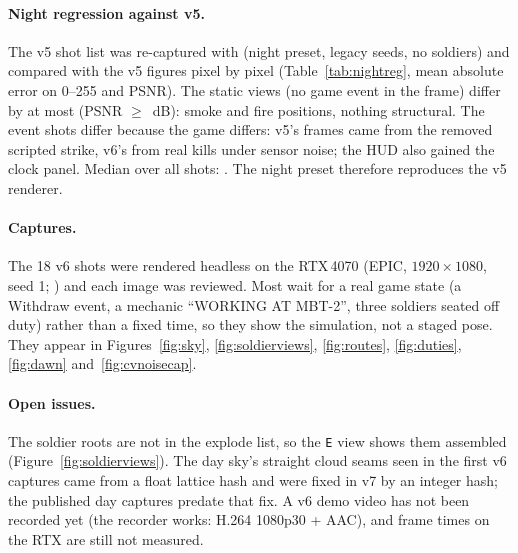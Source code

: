 \paragraph{Night regression against v5.} The v5 shot list was re-captured with  (night preset, legacy seeds, no soldiers) and compared with the v5 figures pixel by pixel (Table~\ref{tab:nightreg}, mean absolute error on 0--255 and PSNR). The \nrStaticN{} static views (no game event in the frame) differ by at most \nrStaticMax{} (PSNR $\ge$ \nrStaticMinPsnr\,dB): smoke and fire positions, nothing structural. The event shots differ because the game differs: v5's frames came from the removed scripted strike, v6's from real kills under sensor noise; the HUD also gained the clock panel. Median over all \nrCount{} shots: \nrMedian. The night preset therefore reproduces the v5 renderer.
\begin{table}[h]
\centering\scriptsize\setlength{\tabcolsep}{4pt}
\caption{Night regression, v6 night preset vs.\ the v5 captures (generated from the two image sets).}\label{tab:nightreg}
\tabNightReg
\end{table}

\paragraph{Captures.} The 18 v6 shots were rendered headless on the RTX\,4070 (EPIC, $1920\times1080$, seed 1; ) and each image was reviewed. Most wait for a real game state (a Withdraw event, a mechanic ``WORKING AT MBT-2'', three soldiers seated off duty) rather than a fixed time, so they show the simulation, not a staged pose. They appear in Figures~\ref{fig:sky}, \ref{fig:soldierviews}, \ref{fig:routes}, \ref{fig:duties}, \ref{fig:dawn} and~\ref{fig:cvnoisecap}.

\paragraph{Open issues.} The soldier roots are not in the explode list, so the \texttt{E} view shows them assembled (Figure~\ref{fig:soldierviews}). The day sky's straight cloud seams seen in the first v6 captures came from a float lattice hash and were fixed in v7 by an integer hash; the published day captures predate that fix. A v6 demo video has not been recorded yet (the recorder works: H.264 1080p30 + AAC), and frame times on the RTX are still not measured.
